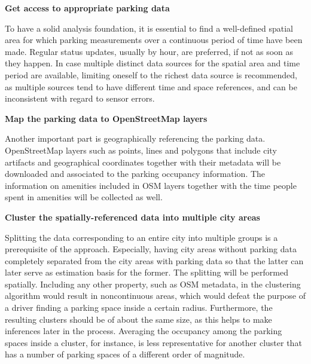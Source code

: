 	\begin{romanlist}
		
		\item{\textbf{Get access to appropriate parking data}}
		
		To have a solid analysis foundation, it is essential to find a well-defined spatial area for which parking measurements over a continuous period of time have been made. Regular status updates, usually by hour, are preferred, if not as soon as they happen. In case multiple distinct data sources for the spatial area and time period are available, limiting oneself to the richest data source is recommended, as multiple sources tend to have different time and space references, and can be inconsistent with regard to sensor errors.
		
		
		\item{\textbf{Map the parking data to OpenStreetMap layers}}
		
		Another important part is geographically referencing the parking data. OpenStreetMap layers such as points, lines and polygons that include city artifacts and geographical coordinates together with their metadata will be downloaded and associated to the parking occupancy information. The information on amenities included in OSM layers together with the time people spent in amenities will be collected as well.
		
		\item{\textbf{Cluster the spatially-referenced data into multiple city areas}}
		
		Splitting the data corresponding to an entire city into multiple groups is a prerequisite of the approach. Especially, having city areas without parking data completely separated from the city areas with parking data so that the latter can later serve as estimation basis for the former. The splitting will be performed spatially. Including any other property, such as OSM metadata, in the clustering algorithm would result in noncontinuous areas, which would defeat the purpose of a driver finding a parking space inside a certain radius. Furthermore, the resulting clusters should be of about the same size, as this helps to make inferences later in the process. Averaging the occupancy among the parking spaces inside a cluster, for instance, is less representative for another cluster that has a number of parking spaces of a different order of magnitude.		
		

\end{romanlist}
